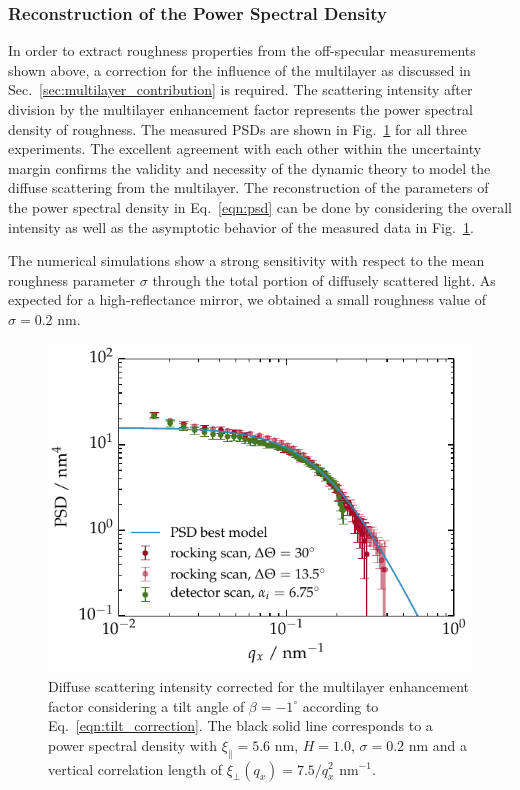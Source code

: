 \subsubsection{Reconstruction of the Power Spectral Density} \label{sec:determination_of_the_psd} In order to extract roughness properties from the off-specular measurements shown above, a correction for the influence of the multilayer as discussed in Sec.~\ref{sec:multilayer_contribution} is required. The scattering intensity after division by the multilayer enhancement factor represents the power spectral density of roughness. The measured PSDs are shown in Fig.~\ref{fig:PSDs_linear} for all three experiments. The excellent agreement with each other within the uncertainty margin confirms the validity and necessity of the dynamic theory to model the diffuse scattering from the multilayer. The reconstruction of the parameters of the power spectral density in Eq.~\eqref{eqn:psd} can be done by considering the overall intensity as well as the asymptotic behavior \cite{salditt_interfacial_1996} of the measured data in Fig.~\ref{fig:PSDs_linear}.

The numerical simulations show a strong sensitivity with respect to the mean roughness parameter $\sigma$ through the total portion of diffusely scattered light. As expected for a high-reflectance mirror, we obtained a small roughness value of $\sigma = 0.2$ nm.
\begin{figure}[htbp]
	\includegraphics{img/PTB17_PSD_for_all_geometries} \caption{Diffuse scattering intensity corrected for the multilayer enhancement factor considering a tilt angle of $\beta=-1^{\circ}$ according to Eq.~\eqref{eqn:tilt_correction}. The black solid line corresponds to a power spectral density with $\xi_\parallel=5.6$ nm, $H=1.0$, $\sigma=0.2$ nm and a vertical correlation length of $\xi_\perp(q_x)=7.5/q_x^2$ nm$^{-1}$.} \label{fig:PSDs_linear} 
\end{figure}

